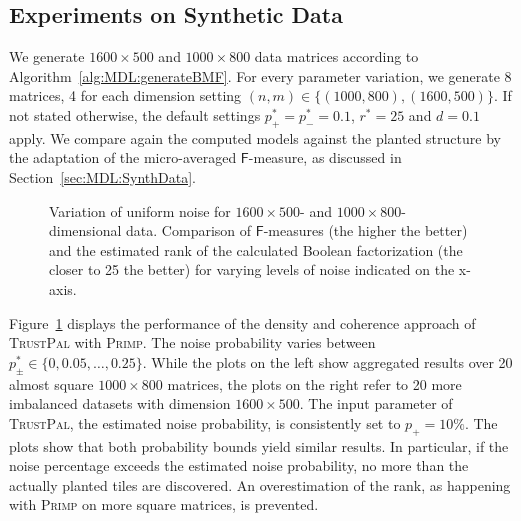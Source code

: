 \subsection{Experiments on Synthetic Data}
We generate $1600\times 500$ and $1000\times 800$ data matrices according to Algorithm~\ref{alg:MDL:generateBMF}. For every parameter variation, we generate 8 matrices, 4 for each dimension setting $(n,m)\in\{(1000,800),(1600,500)\}$. If not stated otherwise, the default settings $p_+^*=p_-^*=0.1$, $r^*=25$ and $d=0.1$ apply. 
We compare again the computed models against the planted structure by the adaptation of the micro-averaged $\mathsf{F}$-measure, as discussed in Section~\ref{sec:MDL:SynthData}.
\begin{figure}[t]
\centering

\caption{Variation of uniform noise for $1600\times 500$- and $1000\times 800$-dimensional data. Comparison of $\mathsf{F}$-measures (the higher the better) and the estimated rank of the calculated Boolean factorization (the closer to 25 the better) for varying levels of noise indicated on the x-axis.}
\label{fig:TP:noise}
\end{figure}

Figure~\ref{fig:TP:noise} displays the performance of the density and coherence approach of \textsc{TrustPal} with \textsc{Primp}. The noise probability varies between $p_\pm^*\in\{0,0.05,\ldots,0.25\}$. While the plots on the left show aggregated results over 20 almost square $1000\times 800$ matrices, the plots on the right refer to 20 more imbalanced datasets with dimension $1600\times 500$. The input parameter of \textsc{TrustPal}, the estimated noise probability, is consistently set to $p_+=10\%$. The plots show that both probability bounds yield similar results. In particular, if the noise percentage exceeds the estimated noise probability, no more than the actually planted tiles are discovered. An overestimation of the rank, as happening with \textsc{Primp} on more square matrices, is prevented. 

